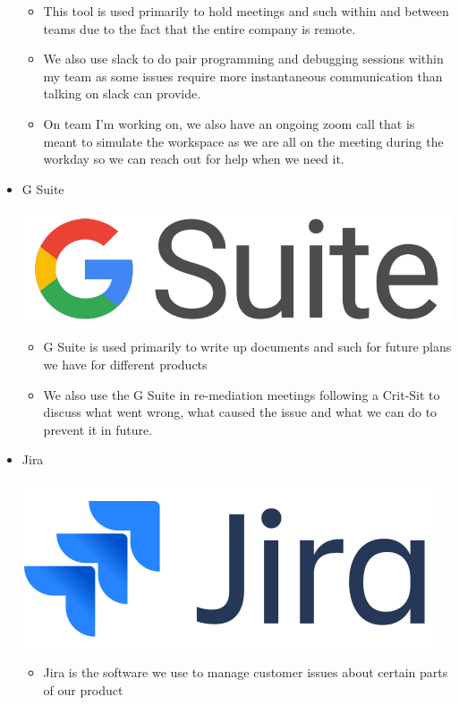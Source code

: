 \documentclass[12pt]{article} %
\begin{document}
\begin{itemize}
\begin{itemize}
\item This tool is used primarily to hold meetings and such within and between teams due to the fact that the entire company is remote.
\item We also use slack to do pair programming and debugging sessions within my team as some issues require more instantaneous communication than talking on slack can provide.
\item On team I'm working on,  we also have an ongoing zoom call that is meant to simulate the workspace as we are all on the meeting during the workday so we can reach out for help when we need it.
\end{itemize}
\item G Suite \\\\
\includegraphics[scale=0.1]{gsuite.png}
\begin{itemize}
\item G Suite is used primarily to write up documents and such for future plans we have for different products
\item We also use the G Suite in re-mediation meetings following a Crit-Sit to discuss what went wrong, what caused the issue and what we can do to prevent it in future.  
\end{itemize}
\item Jira \\\\
\includegraphics[scale=0.14]{jira.png}
\begin{itemize}
\item Jira is the software we use to manage customer issues about certain parts of our product

\end{itemize}
\end{itemize}
\end{document}
